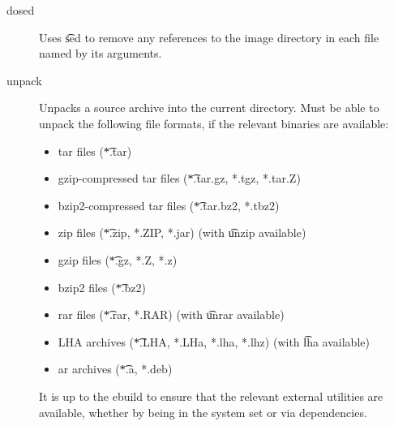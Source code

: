 \begin{description}
\item[dosed] Uses \t{sed} to remove any references to the image directory in each file named by its
    arguments.
\item[unpack] Unpacks a source archive into the current directory. Must be able to unpack the
    following file formats, if the relevant binaries are available:
    \begin{itemize}
    \item tar files (\t{*.tar})
    \item gzip-compressed tar files (\t{*.tar.gz, *.tgz, *.tar.Z})
    \item bzip2-compressed tar files (\t{*.tar.bz2, *.tbz2})
    \item zip files (\t{*.zip, *.ZIP, *.jar}) (with \t{unzip} available)
    \item gzip files (\t{*.gz, *.Z, *.z})
    \item bzip2 files (\t{*.bz2})
    \item rar files (\t{*.rar, *.RAR}) (with \t{unrar} available)
    \item LHA archives (\t{*.LHA, *.LHa, *.lha, *.lhz}) (with \t{lha} available)
    \item ar archives (\t{*.a, *.deb})
    \end{itemize}
    It is up to the ebuild to ensure that the relevant external utilities are available, whether by
    being in the system set or via dependencies.
\end{description}

